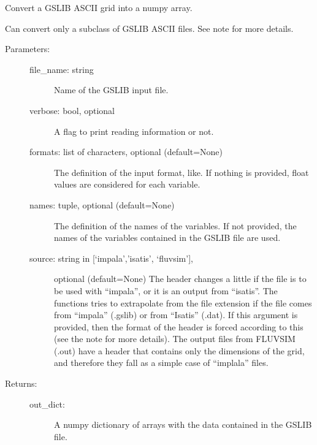 \documentclass[letterpaper,10pt,english]{sphinxmanual}
\begin{document}

\begin{fulllineitems}
\label{\detokenize{appendices:s2Dcd.gslibnumpy.gslib2numpy}}
Convert a GSLIB ASCII grid into a numpy array.

Can convert only a subclass of GSLIB ASCII files.
See note for more details.
\begin{description}
\item[{Parameters:}] \leavevmode\begin{description}
\item[{file\_name: string}] \leavevmode
Name of the GSLIB input file.

\item[{verbose: bool, optional}] \leavevmode
A flag to print reading information or not.

\item[{formats: list of characters, optional (default=None)}] \leavevmode
The definition of the input format, 
like.
If nothing is provided, float values are considered for each
variable.

\item[{names: tuple, optional (default=None)}] \leavevmode
The definition of the names of the variables. If not
provided, the names of the variables contained in the
GSLIB file are used.

\item[{source: string in {[}‘impala’,’isatis’, ‘fluvsim’{]},}] \leavevmode
optional (default=None)
The header changes a little if the file is to be used with
“impala”, or it is an output from “isatis”.  The functions
tries to extrapolate from the file extension if the file
comes from “impala” (.gslib) or from “Isatis” (.dat).  If
this argument is provided, then the format of the header
is forced according to this (see the note for more
details).  The output files from FLUVSIM (.out) have a
header that contains only the dimensions of the grid, and
therefore they fall as a simple case of “implala” files.

\end{description}

\item[{Returns:}] \leavevmode\begin{description}
\item[{out\_dict:}] \leavevmode
A numpy dictionary of arrays with the data contained in
the GSLIB file.


\end{description}
\end{description}
\end{fulllineitems}
\end{document}
